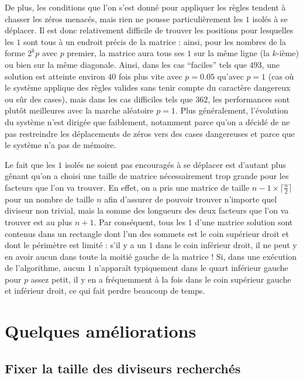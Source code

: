\documentclass[11pt, openany]{article}
\begin{document}
\medskip

De plus, les conditions que l'on s'est donné pour appliquer les règles tendent à chasser les zéros menacés, mais rien ne pousse particulièrement les $1$ isolés à se déplacer. Il est donc relativement difficile de trouver les positions pour lesquelles les $1$ sont tous à un endroit précis de la matrice : ainsi, pour les nombres de la forme $2^kp$ avec $p$ premier, la matrice aura tous ses $1$ sur la même ligne (la $k$-ième) ou bien sur la même diagonale. Ainsi, dans les cas ``faciles'' tels que $493$, une solution est atteinte environ $40$ fois plus vite avec $p=0.05$ qu'avec $p=1$ (cas où le système applique des règles valides sans tenir compte du caractère dangereux ou sûr des cases), mais dans les cas difficiles tels que $362$, les performances sont plutôt meilleures avec la marche aléatoire $p=1$. Plus généralement, l'évolution du système n'est dirigée que faiblement, notamment parce qu'on a décidé de ne pas restreindre les déplacements de zéros vers des cases dangereuses et parce que le système n'a pas de mémoire. 

\medskip
 
Le fait que les $1$ isolés ne soient pas encouragés à se déplacer est d'autant plus gênant qu'on a choisi une taille de matrice nécessairement trop grande pour les facteurs que l'on va trouver. En effet, on a pris une matrice de taille $n-1 \times \lceil \frac{n}{2} \rceil$ pour un nombre de taille $n$ afin d'assurer de pouvoir trouver n'importe quel diviseur non trivial, mais la somme des longueurs des deux facteurs que l'on va trouver est au plus $n+1$. Par conséquent, tous les $1$ d'une matrice solution sont contenus dans un rectangle dont l'un des sommets est le coin supérieur droit et dont le périmètre est limité : s'il y a un $1$ dans le coin inférieur droit, il ne peut y en avoir aucun dans toute la moitié gauche de la matrice ! Si, dans une exécution de l'algorithme, aucun $1$ n'apparaît typiquement dans le quart inférieur gauche pour $p$ assez petit, il y en a fréquemment à la fois dans le coin supérieur gauche et inférieur droit, ce qui fait perdre beaucoup de temps. 



\section*{Quelques améliorations}

\subsection*{Fixer la taille des diviseurs recherchés}
\end{document}
